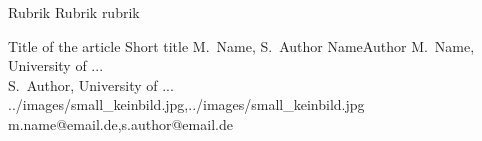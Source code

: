 \documentclass[a4paper,11pt]{article}
\begin{document}
\setcounter{footnote}{0}
\setcounter{figure}{0}


\Abschnitt
{Rubrik}
{Rubrik}
{rubrik}

\vspace{3mm}


\Aufsatz
{Title of the article}
{Short title}
{M.\ Name, S.\ Author}
{NameAuthor}
{M.\ Name, University of ...\\ S.\ Author, University of ...}
{../images/small_keinbild.jpg,../images/small_keinbild.jpg}
{m.name@email.de,s.author@email.de}



\end{document}
